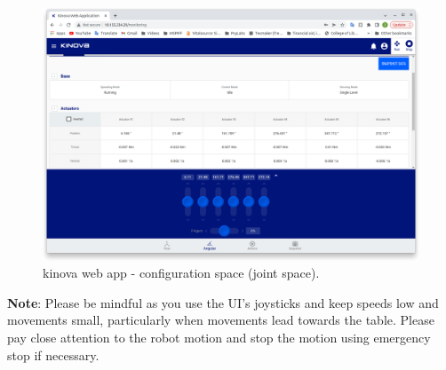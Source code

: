 \documentclass[12pt]{article}
\begin{document}
\begin{enumerate}
    \begin{figure}[H]
    \vspace{-10pt}
    \centering\includegraphics[width=12cm]{images/kinova3.PNG}\vspace{-10pt}
    \caption{kinova web app - configuration space (joint space).}\label{fig:kinova3}
    \end{figure}
\end{enumerate}
\textbf{Note}: Please be mindful as you use the UI’s joysticks and keep speeds low and movements small, particularly when movements lead towards the table. Please pay close attention to the robot motion and stop the motion using emergency stop if necessary. \\
\end{document}
